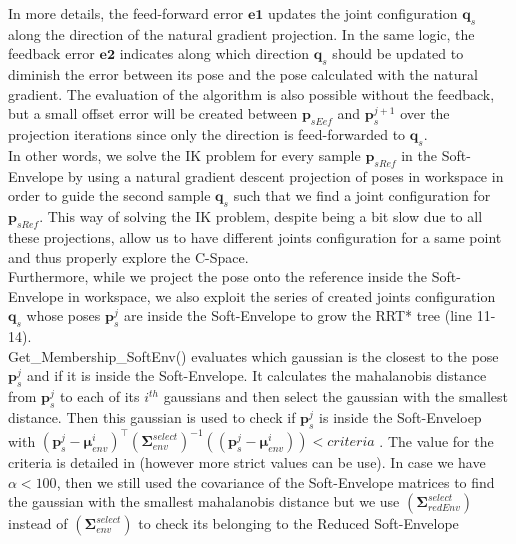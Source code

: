 \documentclass[letterpaper, 10 pt, conference]{ieeeconf}  %
\newcommand{\trsp}{{\!\scriptscriptstyle\top}}
\newcommand{\mb}[1]{{\boldsymbol{#1}}}
\begin{document}
In more details, the feed-forward error $\mb{e1}$ updates the joint configuration $\mb{q}_s$ along the direction of the natural gradient projection. In the same logic, the feedback error $\mb{e2}$ indicates along which direction $\mb{q}_s$ should be updated to diminish the error between its pose and the pose calculated with the natural gradient. The evaluation of the algorithm is also possible without the feedback, but a small offset error will be created between $\mb{p}_{sEef}$ and $\mb{p}_s^{j+1}$ over the projection iterations since only the direction is feed-forwarded to $\mb{q}_s$. \\
 In other words, we solve the IK problem for every sample  $\mb{p}_{sRef}$ in the Soft-Envelope by using a natural gradient descent projection of poses in workspace in order to guide the second sample $\mb{q}_s$ such that we find a joint configuration for $\mb{p}_{sRef}$. This way of solving the IK problem, despite being a bit slow due to all these projections, allow us to have different joints configuration for a same point and thus properly explore the C-Space.\\
Furthermore, while we project the pose onto the reference inside the Soft-Envelope in workspace, we also exploit the series of created joints configuration $\mb{q}_s$ whose poses $\mb{p}_s^j$ are inside the Soft-Envelope to grow the RRT* tree (line 11-14).\\
{\selectfont Get\_Membership\_SoftEnv()} evaluates which gaussian is the closest to the pose $\mb{p}_s^j$ and if it is inside the Soft-Envelope. It calculates the mahalanobis distance from $\mb{p}_s^j$  to each of its $i^{th}$ gaussians and then select the gaussian with the smallest distance. Then this gaussian is used to check if $\mb{p}_s^j$ is inside the Soft-Enveloep with $(\mb{p}_s^j-\mb{\mu}_{env}^i)^{\trsp}(\mb{\Sigma}_{env}^{select})^{-1} ((\mb{p}_s^j-\mb{\mu}_{env}^i)) < criteria$ . The value for the criteria is detailed in \cite{Filzmoser04amultivariate} (however more strict values can be use). In case we have $\alpha<100$, then we still used the covariance of the Soft-Envelope matrices to find the gaussian with the smallest mahalanobis distance but we use $(\mb{\Sigma}_{redEnv}^{select})$ instead of $(\mb{\Sigma}_{env}^{select})$ to check its belonging to the Reduced Soft-Envelope\\
\end{document}
